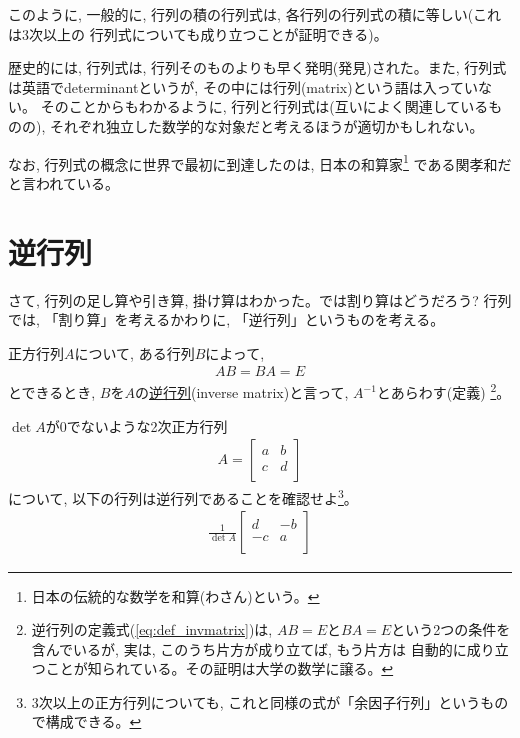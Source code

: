 このように, 一般的に, 行列の積の行列式は, 各行列の行列式の積に等しい(これは3次以上の
行列式についても成り立つことが証明できる)。

歴史的には, 行列式は, 行列そのものよりも早く発明(発見)された。また, 
行列式は英語でdeterminantというが, その中には行列(matrix)という語は入っていない。
そのことからもわかるように, 行列と行列式は(互いによく関連しているものの), 
それぞれ独立した数学的な対象だと考えるほうが適切かもしれない。

なお, 行列式の概念に世界で最初に到達したのは, 日本の和算家\footnote{日本の伝統的な数学を和算(わさん)という。}
である関孝和だと言われている。
\vv



\section{逆行列}

さて, 行列の足し算や引き算, 掛け算はわかった。では割り算はどうだろう? 
行列では, 「割り算」を考えるかわりに, 「逆行列」というものを考える。

正方行列$A$について, ある行列$B$によって, 
\begin{eqnarray}
AB=BA=E\label{eq:def_invmatrix}
\end{eqnarray}
とできるとき, $B$を$A$の\underline{逆行列}(inverse matrix)と言って, 
$A^{-1}$とあらわす(定義)
\footnote{逆行列の定義式(\ref{eq:def_invmatrix})は, 
$AB=E$と$BA=E$という2つの条件を含んでいるが, 実は, このうち片方が成り立てば, もう片方は
自動的に成り立つことが知られている。その証明は大学の数学に譲る。}。

\begin{q}\label{q:matrix_inv2D} $\det A$が0でないような2次正方行列
\begin{eqnarray} A=\begin{bmatrix}
a & b \\
c & d \\
\end{bmatrix}\end{eqnarray}
について, 以下の行列は逆行列であることを確認せよ\footnote{3次以上の正方行列についても, 
これと同様の式が「余因子行列」というもので構成できる。}。
\begin{eqnarray} \frac{1}{\det A}\begin{bmatrix}
d & -b \\
-c & a \\
\end{bmatrix}\label{eq:matrixinv}\end{eqnarray}
\end{q}\mv

